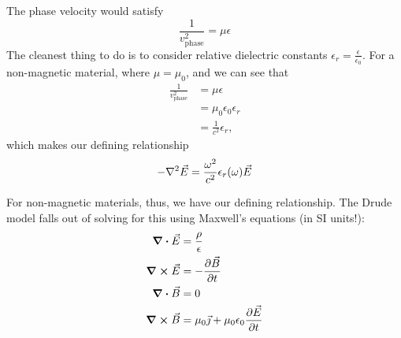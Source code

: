 \documentclass[../main.tex]{subfiles}
\begin{document}
	The phase velocity would satisfy
	\begin{equation}
		\frac{1}{v_{\textrm{phase}}^2} = \mu \epsilon
	\end{equation}
	The cleanest thing to do is to consider relative dielectric constants $\epsilon_r = \frac{\epsilon}{\epsilon_0}$.
	For a non-magnetic material, where $\mu = \mu_0$, and we can see that
	\begin{align}
		\frac{1}{v_{\textrm{phase}}^2} &= \mu \epsilon \\
		&= \mu_0 \epsilon_0 \epsilon_r \\
		&= \frac{1}{c^2} \epsilon_r,
	\end{align}
	which makes our defining relationship
	\begin{equation} \label{eq:DrudeTheory:DielectricDef}
	-\laplacian{\vec{E}} = \frac{\omega^2}{c^2} \epsilon_r(\omega) \vec{E}
	\end{equation}

	For non-magnetic materials, thus, we have our defining relationship.
	The Drude model falls out of solving for this using Maxwell's equations (in SI units!):
	\begin{align}
		\div{\vec{E}} &= \frac{\rho}{\epsilon} \\
		\curl{\vec{E}} &= - \pdv{\vec{B}}{t} \\
		\div{\vec{B}} &= 0 \\
		\curl{\vec{B}} &= \mu_0 \vec{\jmath} + \mu_0 \epsilon_0 \pdv{\vec{E}}{t}
	\end{align}
\end{document}
